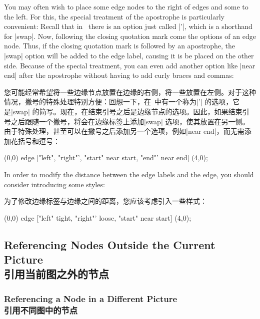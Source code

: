 You may often wish to place some edge nodes to the right of edges and some to
the left. For this, the special treatment of the apostrophe is particularly
convenient: Recall that in \tikzname\ there is an option just called |'|, which
is a shorthand for |swap|. Now, following the closing quotation mark come the
options of an edge node. Thus, if the closing quotation mark is followed by an
apostrophe, the |swap| option will be added to the edge label, causing it is be
placed on the other side. Because of the special treatment, you can even add
another option like |near end| after the apostrophe without having to add curly
braces and commas:

您可能经常希望将一些边缘节点放置在边缘的右侧，将一些放置在左侧。对于这种情况，撇号的特殊处理特别方便：回想一下，在\tikzname\ 中有一个称为|'| 的选项，它是|swap| 的简写。现在，在结束引号之后是边缘节点的选项。因此，如果结束引号之后跟随一个撇号，将会在边缘标签上添加|swap| 选项，使其放置在另一侧。由于特殊处理，甚至可以在撇号之后添加另一个选项，例如|near end|，而无需添加花括号和逗号：

\begin{codeexample}[preamble={\usetikzlibrary{quotes}}]
\tikz
  \draw (0,0) edge ["left", "right"',
                    "start" near start,
                    "end"' near end] (4,0);
\end{codeexample}

In order to modify the distance between the edge labels and the edge, you
should consider introducing some styles:

为了修改边缘标签与边缘之间的距离，您应该考虑引入一些样式：

\begin{codeexample}[preamble={\usetikzlibrary{quotes}}]
\tikz [tight/.style={inner sep=1pt}, loose/.style={inner sep=.7em}]
  \draw (0,0) edge ["left"   tight,
                    "right"' loose,
                    "start"  near start] (4,0);
\end{codeexample}


\subsection{Referencing Nodes Outside the Current Picture\\引用当前图之外的节点}
\label{section-cross-picture-tikz}

\subsubsection{Referencing a Node in a Different Picture\\引用不同图中的节点}

